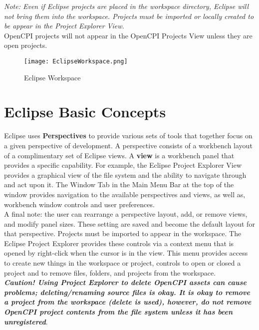 \documentclass[10pt, a4paper, oneside]{article}
\begin{document}
\begin{appendices}
\emph{Note: Even if Eclipse projects are placed in the workspace directory, Eclipse will not bring them into the workspace. Projects must be imported or locally created to be appear in the Project Explorer View.}\\

OpenCPI projects will not appear in the OpenCPI Projects View unless they are open projects.\\

\begin{figure}[h!]
	\centering
	\caption{Eclipse Workspace}{}
	\texttt{[image: EclipseWorkspace.png]}
 \end{figure}
\newpage
\section{Eclipse Basic Concepts}
Eclipse uses \textbf{Perspectives} to provide various sets of tools that together focus on a given perspective of development. A perspective consists of a workbench layout of a complimentary set of Eclipse views. A \textbf{view} is a workbench panel that provides a specific capability. For example, the Eclipse Project Explorer View provides a graphical view of the file system and the ability to navigate through and act upon it. The Window Tab in the Main Menu Bar at the top of the window provides navigation to the available perspectives and views, as well as, workbench window controls and user preferences. \\

A final note: the user can rearrange a perspective layout, add, or remove views, and modify panel sizes. These setting are saved and become the default layout for that perspective. Projects must be imported to appear in the workspace. The Eclipse Project Explorer provides these controls via a context menu that is opened by right-click when the cursor is in the view. This menu provides access to create new things in the workspace or project, controls to open or closed a project and to remove files, folders, and projects from the workspace.\\

\textbf{\emph{Caution! Using Project Explorer to delete OpenCPI assets can cause problems; deleting/renaming source files is okay. It is okay to remove a project from the workspace (delete is used), however, do not remove OpenCPI project contents from the file system unless it has been unregistered}}. \\


\end{appendices}
\end{document}
